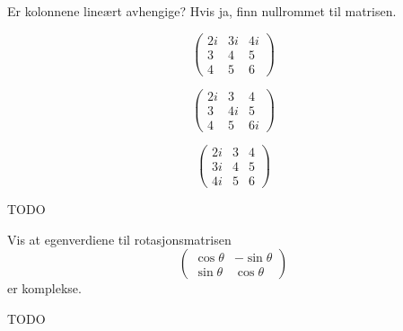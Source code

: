 
\begin{oppgave}
Er kolonnene lineært avhengige? Hvis ja, finn nullrommet til matrisen.
\begin{punkt}
\[
\begin{pmatrix}
2i & 3i & 4i \\ 3 & 4 & 5 \\ 4 & 5 & 6 
\end{pmatrix}
\]
\end{punkt}

\begin{punkt}
\[
\begin{pmatrix}
2i & 3 & 4 \\ 3 & 4i & 5 \\ 4 & 5 & 6i 
\end{pmatrix}
\]
\end{punkt}

\begin{punkt}
\[
\begin{pmatrix}
2i & 3 & 4 \\ 3i & 4 & 5 \\ 4i & 5 & 6 
\end{pmatrix}
\]
\end{punkt}
\end{oppgave}

\begin{losning}
TODO
\end{losning}


\begin{oppgave}
Vis at egenverdiene til rotasjonsmatrisen
\[
\begin{pmatrix}
\cos \theta & -\sin \theta  \\ \sin \theta & \cos \theta  
\end{pmatrix}
\]
er komplekse.
\end{oppgave}

\begin{losning}
TODO
\end{losning}

